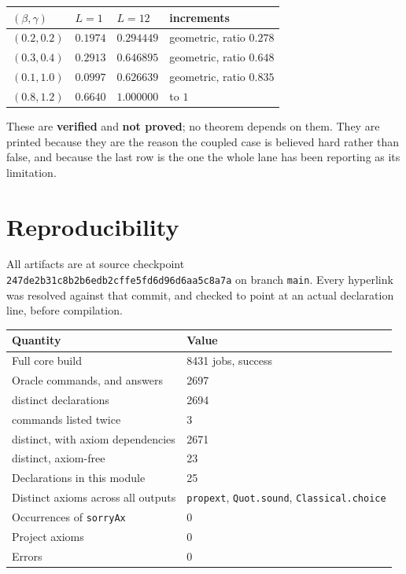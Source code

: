 \documentclass[11pt]{article}
\theoremstyle{definition}
\newcommand{\anchor}{247de2b31c8b2b6edb2cffe5fd6d96d6aa5c8a7a}
\begin{document}
\begin{center}
\begin{tabular}{llll}
\toprule
$(\beta,\gamma)$ & $L=1$ & $L=12$ & increments \\
\midrule
$(0.2,0.2)$ & $0.1974$ & $0.294449$ & geometric, ratio $0.278$ \\
$(0.3,0.4)$ & $0.2913$ & $0.646895$ & geometric, ratio $0.648$ \\
$(0.1,1.0)$ & $0.0997$ & $0.626639$ & geometric, ratio $0.835$ \\
$(0.8,1.2)$ & $0.6640$ & $1.000000$ & to $1$ \\
\bottomrule
\end{tabular}
\end{center}

These are \textbf{verified} and \textbf{not proved}; no theorem depends on them.
They are printed because they are the reason the coupled case is believed hard
rather than false, and because the last row is the one the whole lane has been
reporting as its limitation.

\section{Reproducibility}\label{sec:repro}

All artifacts are at source checkpoint \texttt{\anchor} on branch \texttt{main}.
Every hyperlink was resolved against that commit, and checked to point at an
actual declaration line, before compilation.

\begin{center}
\begin{tabular}{ll}
\toprule
Quantity & Value \\
\midrule
Full core build & 8431 jobs, success \\
Oracle commands, and answers & 2697 \\
\quad distinct declarations & 2694 \\
\quad commands listed twice & 3 \\
\quad distinct, with axiom dependencies & 2671 \\
\quad distinct, axiom-free & 23 \\
Declarations in this module & 25 \\
Distinct axioms across all outputs & \texttt{propext}, \texttt{Quot.sound}, \texttt{Classical.choice} \\
Occurrences of \texttt{sorryAx} & 0 \\
Project axioms & 0 \\
Errors & 0 \\
\bottomrule
\end{tabular}
\end{center}
\end{document}
